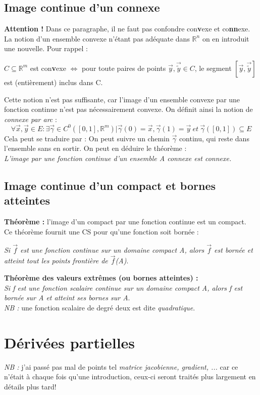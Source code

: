 \documentclass[11pt, a4paper, openany]{book}
\begin{document}
\subsection{Image continue d'un connexe}
\textbf{Attention !} Dans ce paragraphe, il ne faut pas confondre con\textbf{v}exe et co\textbf{nn}exe. La notion d'un ensemble convexe n'étant pas adéquate dans $\mathbb{R}^n$ on en introduit une nouvelle. Pour rappel :
\begin{center}
	$C \subseteq \mathbb{R}^m$ est con\textbf{v}exe $\Leftrightarrow$ pour toute paires de points $\vec{y}, \vec{\tilde{y}} \in C$, le segment $[\vec{y}, \vec{\tilde{y}}]$ est (entièrement) inclus dans C.
\end{center}
Cette notion n'est pas suffisante, car l'image d'un ensemble convexe par une fonction continue n'est pas nécessairement convexe. On définit ainsi la notion de \textit{connexe par arc} :
$$\forall \vec{x}, \vec{y} \in E : \exists \vec{\gamma} \in C^0([0,1], \mathbb{R}^m) | \vec{\gamma}(0) = \vec{x}, \vec{\gamma}(1) = \vec{y}\ et\  \vec{\gamma}([0,1]) \subseteq E$$
Cela peut se traduire par : On peut suivre un chemin $\vec{\gamma}$ continu, qui reste dans l'ensemble sans en sortir. On peut en déduire le théorème :\\
\textit{L'image par une fonction continue d'un ensemble A connexe est connexe.}

\subsection{Image continue d'un compact et bornes atteintes}
\textbf{Théorème :} l'image d'un compact par une fonction continue est un compact.\\
Ce théorème fournit une CS pour qu'une fonction soit bornée :
\begin{center}
	\textit{Si $\vec{f}$ est une fonction continue sur un domaine compact A, alors $\vec{f}$ est bornée et atteint tout les points frontière de $\vec{f}$(A)}.
\end{center}
\textbf{Théorème des valeurs extrêmes (ou bornes atteintes) :}\\
\textit{Si f est une fonction \emph{scalaire} continue sur un domaine compact A, alors f est bornée sur A et atteint ses bornes sur A}.\\

\textit{NB :} une fonction scalaire de degré deux est dite \textit{quadratique}.

\section{Dérivées partielles}
\textit{NB :} j'ai passé pas mal de points tel \textit{matrice jacobienne, gradient, ...} car ce n'était à chaque fois qu'une introduction, ceux-ci seront traités plus largement en détails plus tard!
\end{document}
